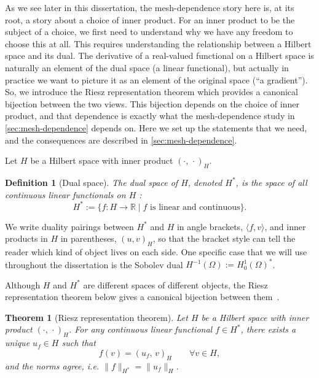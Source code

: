 \documentclass[a4paper,11pt]{article}
\newcommand{\R}{\mathbb{R}}
\newcommand{\Om}{\Omega}
\newcommand{\inner}[3]{(#1,\,#2)_{#3}}        %
\theoremstyle{spacedplain} \newtheorem{theorem}[counter]{Theorem} \newtheorem{lemma}[counter]{Lemma} \newtheorem{prop}[counter]{Proposition} \newtheorem{cor}[counter]{Corollary}
\theoremstyle{spaceddefinition} \newtheorem{defn}[counter]{Definition} \newtheorem{example}[counter]{Example} \newtheorem{remark}[counter]{Remark}
\begin{document}
As we see later in this dissertation, the mesh-dependence story here is, at its root, a story about a choice of inner product. For an inner product to be the subject of a choice, we first need to understand why we have any freedom to choose this at all. This requires understanding the relationship between a Hilbert space and its dual. The derivative of a real-valued functional on a Hilbert space is naturally an element of the dual space (a linear functional), but actually in practice we want to picture it as an element of the original space (``a gradient''). So, we introduce the Riesz representation theorem which provides a canonical bijection between the two views. This bijection depends on the choice of inner product, and that dependence is exactly what the mesh-dependence study in \cref{sec:mesh-dependence} depends on. Here we set up the statements that we need, and the consequences are described in \cref{sec:mesh-dependence}.

Let $H$ be a Hilbert space with inner product $\inner{\cdot}{\cdot}{H}$.

\begin{defn}[Dual space] The \emph{dual space} of $H$, denoted $H^{*}$, is the space of all continuous linear functionals on $H$ \citep[p.~21]{shfp2017}:
\begin{equation}
  H^{*} := \bigl\{ f : H \to \R \;\big|\;
                    f \text{ is linear and continuous} \bigr\}.
\end{equation}
\end{defn}

We write duality pairings between $H^{*}$ and $H$ in angle brackets, $\langle f, v \rangle$, and inner products in $H$ in parentheses, $(u, v)_H$, so that the bracket style can tell the reader which kind of object lives on each side. One specific case that we will use throughout the dissertation is the Sobolev dual $H^{-1}(\Om) := H_0^1(\Om)^{*}$.

Although $H$ and $H^{*}$ are different spaces of different objects, the Riesz representation theorem below gives a canonical bijection between them~\citep[Theorem~1.1]{shfp2017}.

\begin{theorem}[Riesz representation theorem]
\label{thm:riesz} Let $H$ be a Hilbert space with inner product $\inner{\cdot}{\cdot}{H}$. For any continuous linear functional $f \in H^{*}$, there exists a unique $u_f \in H$ such that
\begin{equation}
  f(v) = \inner{u_f}{v}{H}
  \qquad \forall v \in H,
\end{equation}
and the norms agree, i.e. $\|f\|_{H^{*}} = \|u_f\|_H$.
\end{theorem}
\end{document}

